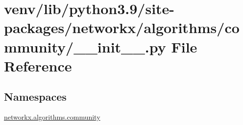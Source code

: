 \hypertarget{venv_2lib_2python3_89_2site-packages_2networkx_2algorithms_2community_2____init_____8py}{}\section{venv/lib/python3.9/site-\/packages/networkx/algorithms/community/\+\_\+\+\_\+init\+\_\+\+\_\+.py File Reference}
\label{venv_2lib_2python3_89_2site-packages_2networkx_2algorithms_2community_2____init_____8py}
\subsection*{Namespaces}
\begin{DoxyCompactItemize}
\item 
 \hyperlink{namespacenetworkx_1_1algorithms_1_1community}{networkx.\+algorithms.\+community}
\end{DoxyCompactItemize}
